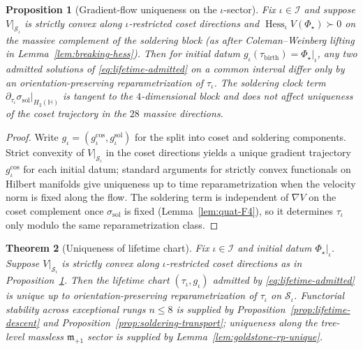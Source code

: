 \documentclass[11pt]{article}
\theoremstyle{plain}
\newtheorem{theorem}{Theorem}[section]
\newtheorem{proposition}[theorem]{Proposition}
\theoremstyle{definition}
\theoremstyle{remark}
\numberwithin{equation}{section}
\newcommand{\Quat}{\mathbb{H}}
\newcommand{\orderparam}{\Phi}
\newcommand{\Hess}{\operatorname{Hess}}
\begin{document}
\begin{proposition}[Gradient-flow uniqueness on the $\iota$-sector]
\label{prop:lifetime-flow-unique}
Fix $\iota\in\mathcal{I}$ and suppose $V|_{\mathcal{S}_\iota}$ is strictly
convex along $\iota$-restricted coset directions and
$\Hess_\iota V(\orderparam_\star)\succ 0$ on the massive complement of the
soldering block (as after Coleman--Weinberg lifting in
Lemma~\ref{lem:breaking-hess}). Then for initial datum
$g_\iota(\tau_{\mathrm{birth}})=\orderparam_\star|_\iota$, any two admitted
solutions of \eqref{eq:lifetime-admitted} on a common interval differ only
by an orientation-preserving reparametrization of $\tau_\iota$. The soldering
clock term $\partial_{\tau_\iota}\sigma_{\mathrm{sol}}|_{H_2(\Quat)}$ is
tangent to the $4$-dimensional block and does not affect uniqueness of the
coset trajectory in the $28$ massive directions.
\end{proposition}

\begin{proof}
Write $g_\iota=(g_\iota^{\mathrm{cos}},g_\iota^{\mathrm{sol}})$ for the
split into coset and soldering components. Strict convexity of
$V|_{\mathcal{S}_\iota}$ in the coset directions yields a unique gradient
trajectory $g_\iota^{\mathrm{cos}}$ for each initial datum; standard
arguments for strictly convex functionals on Hilbert manifolds give uniqueness
up to time reparametrization when the velocity norm is fixed along the flow.
The soldering term is independent of $\nabla V$ on the coset complement once
$\sigma_{\mathrm{sol}}$ is fixed (Lemma~\ref{lem:quat-F4}), so it determines
$\tau_\iota$ only modulo the same reparametrization class.
\end{proof}

\begin{theorem}[Uniqueness of lifetime chart]\label{thm:lifetime-unique}
Fix $\iota\in\mathcal{I}$ and initial datum
$\orderparam_\star|_\iota$. Suppose $V|_{\mathcal{S}_\iota}$ is strictly
convex along $\iota$-restricted coset directions as in
Proposition~\ref{prop:lifetime-flow-unique}. Then the lifetime chart
$(\tau_\iota,g_\iota)$ admitted by \eqref{eq:lifetime-admitted} is unique up
to orientation-preserving reparametrization of $\tau_\iota$ on
$\mathcal{S}_\iota$. Functorial stability across exceptional rungs
$n\leq8$ is supplied by Proposition~\ref{prop:lifetime-descent} and
Proposition~\ref{prop:soldering-transport}; uniqueness along the tree-level
massless $\mathfrak{m}_{+1}$ sector is supplied by
Lemma~\ref{lem:goldstone-rp-unique}.
\end{theorem}
\end{document}
